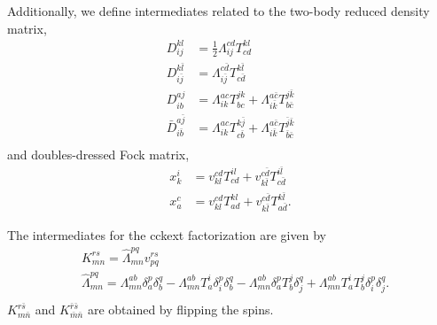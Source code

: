 \documentclass[a4paper,12pt,oneside]{book}
\newcommand{\spa}[1]{{#1}}
\newcommand{\spb}[1]{\bar{#1}}
\newcommand{\half}{\frac{1}{2}}
\begin{document}
Additionally, we define intermediates related to the two-body reduced density matrix,
\begin{equation}
\begin{aligned}
D_{\spa{i}\spa{j}}^{\spa{k}\spa{l}} &= \half Λ_{\spa{i}\spa{j}}^{\spa{c}\spa{d}} T^{\spa{k}\spa{l}}_{\spa{c}\spa{d}}\\
D_{\spa{i}\spb{j}}^{\spa{k}\spb{l}} &= Λ_{\spa{i}\spb{j}}^{\spa{c}\spb{d}} T^{\spa{k}\spb{l}}_{\spa{c}\spb{d}}\\
D_{\spa{i}\spa{b}}^{\spa{a}\spa{j}} &= Λ_{\spa{i}\spa{k}}^{\spa{a}\spa{c}} T^{\spa{j}\spa{k}}_{\spa{b}\spa{c}}
+Λ_{\spa{i}\spb{k}}^{\spa{a}\spb{c}} T^{\spa{j}\spb{k}}_{\spa{b}\spb{c}}\\
\bar D_{\spa{i}\spb{b}}^{\spa{a}\spb{j}} &= Λ_{\spa{i}\spa{k}}^{\spa{a}\spa{c}} T^{\spa{k}\spb{j}}_{\spa{c}\spb{b}}
+Λ_{\spa{i}\spb{k}}^{\spa{a}\spb{c}} T^{\spb{j}\spb{k}}_{\spb{b}\spb{c}}\\
\end{aligned}
\end{equation}
and doubles-dressed Fock matrix,
\begin{equation}
\begin{aligned}
x_{\spa{k}}^{\spa{i}} &= v_{\spa{k}\spa{l}}^{\spa{c}\spa{d}} T^{\spa{i}\spa{l}}_{\spa{c}\spa{d}}
+v_{\spa{k}\spb{l}}^{\spa{c}\spb{d}} T^{\spa{i}\spb{l}}_{\spa{c}\spb{d}}\\
x_{\spa{a}}^{\spa{c}} &= v_{\spa{k}\spa{l}}^{\spa{c}\spa{d}} T^{\spa{k}\spa{l}}_{\spa{a}\spa{d}}
+v_{\spa{k}\spb{l}}^{\spa{c}\spb{d}} T^{\spa{k}\spb{l}}_{\spa{a}\spb{d}}.
\end{aligned}
\end{equation}

The intermediates for the \textsf{cckext} factorization are given by
\begin{equation}
\begin{aligned}
&K_{\spa{m}\spa{n}}^{\spa{r}\spa{s}} = \hat \Lambda_{\spa{m}\spa{n}}^{\spa{p}\spa{q}} v_{\spa{p}\spa{q}}^{\spa{r}\spa{s}} \\
&\hat \Lambda_{\spa{m}\spa{n}}^{\spa{p}\spa{q}} = Λ_{\spa{m}\spa{n}}^{\spa{a}\spa{b}}\delta_{\spa{a}}^{\spa{p}}\delta_{\spa{b}}^{\spa{q}} 
- Λ_{\spa{m}\spa{n}}^{\spa{a}\spa{b}} T^\spa{i}_\spa{a} \delta_\spa{i}^\spa{p} \delta_\spa{b}^\spa{q}
- Λ_{\spa{m}\spa{n}}^{\spa{a}\spa{b}} \delta_\spa{a}^\spa{p} T^\spa{j}_\spa{b} \delta_\spa{j}^\spa{q}
+ Λ_{\spa{m}\spa{n}}^{\spa{a}\spa{b}} T^\spa{i}_\spa{a} T^\spa{j}_\spa{b} \delta_\spa{i}^\spa{p} \delta_\spa{j}^\spa{q}.\\
\end{aligned}
\end{equation}
$K_{\spa{m}\spb{n}}^{\spa{r}\spb{s}}$ and $K_{\spb{m}\spb{n}}^{\spb{r}\spb{s}}$ are obtained by flipping the spins.
\end{document}
